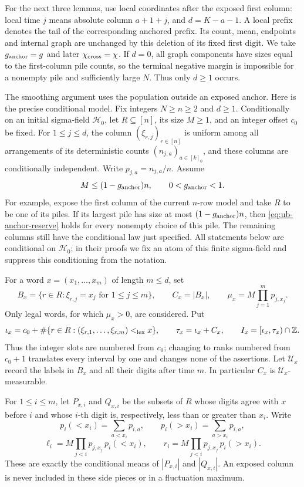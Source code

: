 \documentclass[11pt]{article}
\numberwithin{equation}{section}
\newcommand{\1}{\mathbf 1}
\begin{document}
For the next three lemmas, use local coordinates after the exposed
first column: local time $j$ means absolute column $a+1+j$, and
$d=K-a-1$. A local prefix denotes the tail of the corresponding
anchored prefix. Its count, mean, endpoints and internal graph are
unchanged by this deletion of its fixed first digit. We take
$g_{\rm anchor}=g$ and later $\chi_{\rm cross}=\chi$.
If $d=0$, all graph components have sizes equal to the first-column
pile counts, so the terminal negative margin is impossible for a
nonempty pile and sufficiently large $N$. Thus only $d\ge1$ occurs.

The smoothing argument uses the population outside an exposed anchor.
Here is the precise conditional model.  Fix integers $N\ge n\ge2$ and
$d\ge1$.  Conditionally on an initial sigma-field $\mathcal H_0$, let
$R\subseteq[n]$, its size $M\ge1$, and an integer offset $c_0$ be fixed.
For $1\le j\le d$, the column $(\xi_{r,j})_{r\in[n]}$ is uniform among
all arrangements of its deterministic counts $(n_{j,a})_{a\in[k]_0}$,
and these columns are conditionally independent.  Write
$p_{j,a}=n_{j,a}/n$.  Assume
\begin{equation}
\label{eq:ub-anchor-reserve}
  M\le(1-g_{\rm anchor})n,\qquad 0<g_{\rm anchor}<1.
\end{equation}
For example, expose the first column of the current $n$-row model and
take $R$ to be one of its piles.  If its largest pile has size at most
$(1-g_{\rm anchor})n$, then \eqref{eq:ub-anchor-reserve} holds for every
nonempty choice of this pile.  The remaining columns still have the
conditional law just specified.  All statements below are conditional
on $\mathcal H_0$; in their proofs we fix an atom of this finite
sigma-field and suppress this conditioning from the notation.

For a word $x=(x_1,\ldots,x_m)$ of length $m\le d$, set
\[
 B_x=\{r\in R:\xi_{r,j}=x_j\text{ for }1\le j\le m\},\qquad
 C_x=|B_x|,\qquad \mu_x=M\prod_{j=1}^m p_{j,x_j}.
\]
Only legal words, for which $\mu_x>0$, are considered.  Put
\[
 \iota_x=c_0+\#\{r\in R:(\xi_{r,1},\ldots,\xi_{r,m})<_{\rm lex}x\},
 \qquad \tau_x=\iota_x+C_x,
 \qquad I_x=[\iota_x,\tau_x)\cap\mathbb Z.
\]
Thus the integer slots are numbered from $c_0$; changing to ranks
numbered from $c_0+1$ translates every interval by one and changes none
of the assertions.  Let $\mathcal U_x$ record the labels in $B_x$ and
all their digits after time $m$.  In particular $C_x$ is
$\mathcal U_x$-measurable.

For $1\le i\le m$, let $P_{x,i}$ and $Q_{x,i}$ be the subsets of $R$
whose digits agree with $x$ before $i$ and whose $i$-th digit is,
respectively, less than or greater than $x_i$.  Write
\[
 p_i(<x_i)=\sum_{a<x_i}p_{i,a},\qquad
 p_i(>x_i)=\sum_{a>x_i}p_{i,a},
\]
\[
 \ell_i=M\prod_{j<i}p_{j,x_j}\,p_i(<x_i),\qquad
 r_i=M\prod_{j<i}p_{j,x_j}\,p_i(>x_i).
\]
These are exactly the conditional means of $|P_{x,i}|$ and $|Q_{x,i}|$.
An exposed column is never included in these side pieces or in a
fluctuation maximum.
\end{document}
